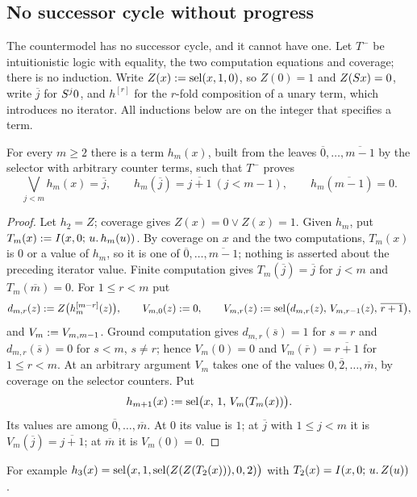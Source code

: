 \subsection{No successor cycle without progress}

The countermodel has no successor cycle, and it cannot have one. Let $T^{-}$ be
intuitionistic logic with equality, the two computation equations and
coverage; there is no induction. Write $Z(x)\mathrel{:=}\operatorname{sel}(x,1,0)$, so $Z(0)=1$ and
$Z(S x)=0$, write $\overline{j}$ for $S^{j}0$, and $h^{[r]}$ for the
$r$-fold composition of a unary term, which introduces no iterator. All
inductions below are on the integer that specifies a term.

\begin{lemma}
\label{obs:lem:clocks}
For every $m\ge 2$ there is a term $h_m(x)$, built from the leaves
$\overline{0},\dots,\overline{m-1}$ by the selector with arbitrary counter
terms, such that $T^{-}$ proves
\[
\bigvee_{j<m}h_m(x)=\overline{j},\qquad
h_m(\overline{j})=\overline{j+1}\ (j<m-1),\qquad
h_m(\overline{m-1})=0 .
\]
\end{lemma}

\begin{proof}
Let $h_2=Z$; coverage gives $Z(x)=0\vee Z(x)=1$. Given $h_m$, put
$T_m(x)\mathrel{:=}I(x,0;\,u.\,h_m(u))$. By coverage on $x$ and the two
computations, $T_m(x)$ is $0$ or a value of $h_m$, so it is one of
$\overline{0},\dots,\overline{m-1}$; nothing is asserted about the preceding
iterator value. Finite computation gives $T_m(\overline{j})=\overline{j}$ for
$j<m$ and $T_m(\overline{m})=0$. For $1\le r<m$ put
\[
d_{m,r}(z)\mathrel{:=} Z\bigl(h_m^{[m-r]}(z)\bigr),\qquad
V_{m,0}(z)\mathrel{:=} 0,\qquad
V_{m,r}(z)\mathrel{:=}\operatorname{sel}\bigl(d_{m,r}(z),\,V_{m,r-1}(z),\,\overline{r+1}\bigr),
\]
and $V_m\mathrel{:=} V_{m,m-1}$. Ground computation gives $d_{m,r}(\overline{s})=1$
for $s=r$ and $d_{m,r}(\overline{s})=0$ for $s<m$, $s\ne r$; hence
$V_m(0)=0$ and $V_m(\overline{r})=\overline{r+1}$ for $1\le r<m$. At an
arbitrary argument $V_m$ takes one of the values
$0,\overline{2},\dots,\overline{m}$, by coverage on the selector counters. Put
\[
h_{m+1}(x)\mathrel{:=}\operatorname{sel}\bigl(x,\,1,\,V_m(T_m(x))\bigr).
\]
Its values are among $\overline{0},\dots,\overline{m}$. At $0$ its value is
$1$; at $\overline{j}$ with $1\le j<m$ it is
$V_m(\overline{j})=\overline{j+1}$; at $\overline{m}$ it is $V_m(0)=0$.
\end{proof}

For example $h_3(x)=\operatorname{sel}\bigl(x,1,\operatorname{sel}(Z(Z(T_2(x))),0,2)\bigr)$ with
$T_2(x)=I(x,0;\,u.\,Z(u))$.

